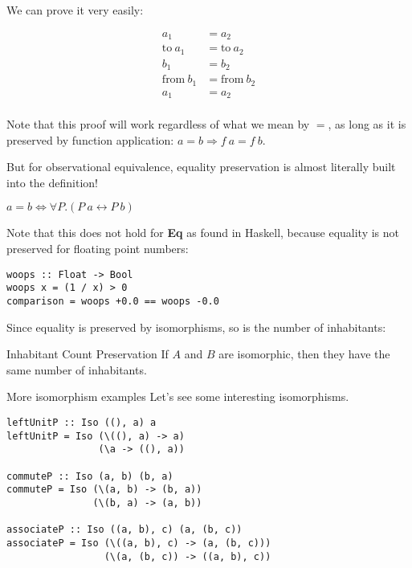 \documentclass[tikz]{beamer}
\theoremstyle{definition}
\begin{document}
\begin{frame}[fragile]
We can prove it very easily:

\begin{align*}
    a_1 &= a_2 \\
    \text{to}~a_1 &= \text{to}~a_2 \\
    b_1 &= b_2 \\
    \text{from}~b_1 &= \text{from}~b_2 \\
    a_1 &= a_2 \\
\end{align*}

Note that this proof will work regardless of what we mean by $=$, as long as it is preserved by function application: $a = b \Rightarrow f~a = f~b$.
\end{frame}

\begin{frame}[fragile]
But for observational equivalence, equality preservation is almost literally built into the definition!

\begin{center}
    $a = b \iff \forall P. (P~a \leftrightarrow P~b)$
\end{center}
\end{frame}


\begin{frame}[fragile]
Note that this does not hold for \textbf{Eq} as found in Haskell, because equality is not preserved for floating point numbers:
\begin{verbatim}
woops :: Float -> Bool
woops x = (1 / x) > 0
comparison = woops +0.0 == woops -0.0
\end{verbatim}
\end{frame}


\begin{frame}[fragile]
Since equality is preserved by isomorphisms, so is the number of inhabitants:

\begin{block}{Inhabitant Count Preservation}
If $A$ and $B$ are isomorphic, then they have the same number of inhabitants.
\end{block}
\end{frame}

\begin{frame}[fragile]{More isomorphism examples}
Let's see some interesting isomorphisms.

\begin{verbatim}
leftUnitP :: Iso ((), a) a
leftUnitP = Iso (\((), a) -> a)
                (\a -> ((), a))

commuteP :: Iso (a, b) (b, a)
commuteP = Iso (\(a, b) -> (b, a))
               (\(b, a) -> (a, b))

associateP :: Iso ((a, b), c) (a, (b, c))
associateP = Iso (\((a, b), c) -> (a, (b, c)))
                 (\(a, (b, c)) -> ((a, b), c))
\end{verbatim}
\end{frame}
\end{document}
